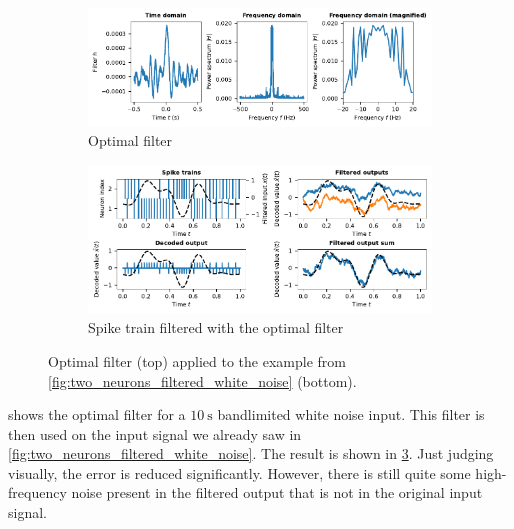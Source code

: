 \documentclass[10pt,letterpaper,oneside]{article}
\begin{document}
\begin{figure}
	\begin{subfigure}{\textwidth}
		\centering
		\includegraphics{media/optimal_filter.pdf}
		\caption{Optimal filter}
		\label{fig:optimal_filter}
	\end{subfigure}
	\begin{subfigure}{\textwidth}
		\centering
		\includegraphics{media/two_neurons_filtered_optimal_simple_small.pdf}
		\caption{Spike train filtered with the optimal filter}
		\label{fig:two_neurons_filtered_optimal_simple_small}
	\end{subfigure}
	\caption{Optimal filter (top) applied to the example from \cref{fig:two_neurons_filtered_white_noise} (bottom). }
\end{figure}

 shows the optimal filter for a $\SI{10}{\second}$ bandlimited white noise input. This filter is then used on the input signal we already saw in \cref{fig:two_neurons_filtered_white_noise}. The result is shown in \cref{fig:two_neurons_filtered_optimal_simple_small}. Just judging visually, the error is reduced significantly. However, there is still quite some high-frequency noise present in the filtered output that is not in the original input signal. 
\end{document}
